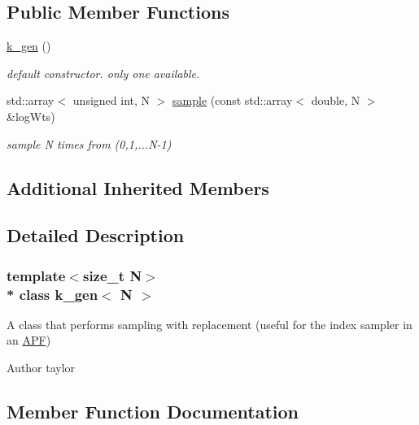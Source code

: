 \subsection*{Public Member Functions}
\begin{DoxyCompactItemize}
\item 
\hyperlink{classk__gen_ace54048feceb6965d7c3b51c5a4b7eea}{k\+\_\+gen} ()\hypertarget{classk__gen_ace54048feceb6965d7c3b51c5a4b7eea}{}\label{classk__gen_ace54048feceb6965d7c3b51c5a4b7eea}

\begin{DoxyCompactList}\small\item\em default constructor. only one available. \end{DoxyCompactList}\item 
std\+::array$<$ unsigned int, N $>$ \hyperlink{classk__gen_a9256cf954970f71dc1c5ce36081b2364}{sample} (const std\+::array$<$ double, N $>$ \&log\+Wts)
\begin{DoxyCompactList}\small\item\em sample N times from (0,1,...N-\/1) \end{DoxyCompactList}\end{DoxyCompactItemize}
\subsection*{Additional Inherited Members}


\subsection{Detailed Description}
\subsubsection*{template$<$size\+\_\+t N$>$\\*
class k\+\_\+gen$<$ N $>$}

A class that performs sampling with replacement (useful for the index sampler in an \hyperlink{classAPF}{A\+PF}) 

\begin{DoxyAuthor}{Author}
taylor 
\end{DoxyAuthor}


\subsection{Member Function Documentation}
